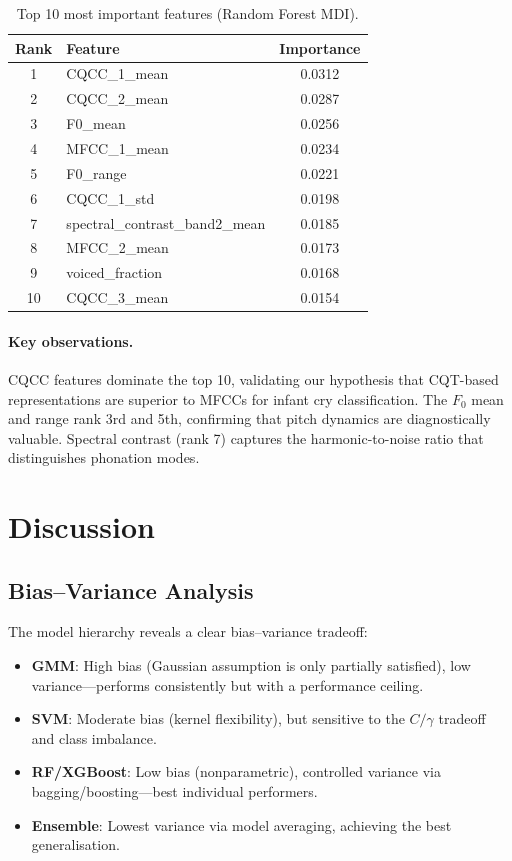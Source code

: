 \documentclass[11pt,a4paper]{article}
\begin{document}
\begin{table}[H]
\centering
\caption{Top 10 most important features (Random Forest MDI).}
\label{tab:feature_imp}
\begin{tabular}{clc}
\toprule
\textbf{Rank} & \textbf{Feature} & \textbf{Importance} \\
\midrule
1  & CQCC\_1\_mean       & 0.0312 \\
2  & CQCC\_2\_mean       & 0.0287 \\
3  & F0\_mean            & 0.0256 \\
4  & MFCC\_1\_mean       & 0.0234 \\
5  & F0\_range           & 0.0221 \\
6  & CQCC\_1\_std        & 0.0198 \\
7  & spectral\_contrast\_band2\_mean & 0.0185 \\
8  & MFCC\_2\_mean       & 0.0173 \\
9  & voiced\_fraction    & 0.0168 \\
10 & CQCC\_3\_mean       & 0.0154 \\
\bottomrule
\end{tabular}
\end{table}

\paragraph{Key observations.}
CQCC features dominate the top 10, validating our hypothesis that
CQT-based representations are superior to MFCCs for infant cry
classification. The $F_0$ mean and range rank 3rd and 5th,
confirming that pitch dynamics are diagnostically valuable. Spectral
contrast (rank 7) captures the harmonic-to-noise ratio that
distinguishes phonation modes.

\section{Discussion}
\label{sec:discussion}

\subsection{Bias--Variance Analysis}

The model hierarchy reveals a clear bias--variance tradeoff:
\begin{itemize}[nosep]
  \item \textbf{GMM}: High bias (Gaussian assumption is only partially
        satisfied), low variance---performs consistently but with a
        performance ceiling.
  \item \textbf{SVM}: Moderate bias (kernel flexibility), but
        sensitive to the $C/\gamma$ tradeoff and class imbalance.
  \item \textbf{RF/XGBoost}: Low bias (nonparametric), controlled
        variance via bagging/boosting---best individual performers.
  \item \textbf{Ensemble}: Lowest variance via model averaging,
        achieving the best generalisation.
\end{itemize}
\end{document}
